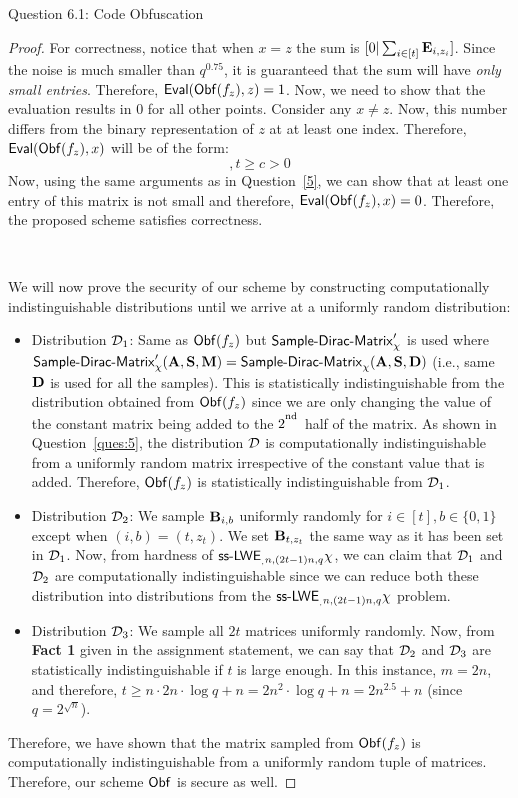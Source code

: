 \begin{solution}{Question 6.1: Code Obfuscation}
\begin{proof}
        For correctness, notice that when $x = z$ the sum is $[0 | \sum_{i\in[t]}\mathbf{E}_{i,z_i}]$. Since the noise is much smaller than $q^{0.75}$, it is guaranteed that the sum will have \textit{only small entries}. Therefore, $\mathsf{Eval}(\mathsf{Obf}(f_z), z) = 1$. Now, we need to show that the evaluation results in $0$ for all other points. Consider any $x\neq z$. Now, this number differs from the binary representation of $z$ at at least one index. Therefore, $\mathsf{Eval}(\mathsf{Obf}(f_z), x)$ will be of the form:
        \begin{equation}
            [\bfA' | \bfS\cdot\bfA' + \sum_{i\in[t]}\bfE_{i,x_i} + c\cdot\bfD], t\geq c > 0
        \end{equation}
        Now, using the same arguments as in Question~\ref{5}, we can show that at least one entry of this matrix is not small and therefore, $\mathsf{Eval}(\mathsf{Obf}(f_z), x) = 0$. Therefore, the proposed scheme satisfies correctness.\par~\par
        We will now prove the security of our scheme by constructing computationally indistinguishable distributions until we arrive at a uniformly random distribution:
        \begin{itemize}
            \item Distribution $\mathcal{D}_1$: Same as $\mathsf{Obf}(f_z)$ but $\mathsf{Sample\text{-}Dirac\text{-}Matrix}_\chi'$ is used where $\mathsf{Sample\text{-}Dirac\text{-}Matrix}_\chi'(\mathbf{A}, \mathbf{S}, \mathbf{M}) = \mathsf{Sample\text{-}Dirac\text{-}Matrix}_\chi(\mathbf{A}, \mathbf{S}, \mathbf{D})$ (i.e., same $\mathbf{D}$ is used for all the samples). This is statistically indistinguishable from the distribution obtained from $\mathsf{Obf}(f_z)$ since we are only changing the value of the constant matrix being added to the $2^\textsuperscript{nd}$ half of the matrix. As shown in Question~\ref{ques:5}, the distribution $\mathcal{D}$ is computationally indistinguishable from a uniformly random matrix irrespective of the constant value that is added. Therefore, $\mathsf{Obf}(f_z)$ is statistically indistinguishable from $\mathcal{D}_1$.
            \item Distribution $\mathcal{D}_2$: We sample $\mathbf{B}_{i,b}$ uniformly randomly for $i\in[t],b\in\{0,1\}$ except when $(i,b) = (t,z_t)$. We set $\mathbf{B}_{t,z_t}$ the same way as it has been set in $\mathcal{D}_1$. Now, from hardness of $\mathsf{ss\text{-}LWE}_{_,n,(2t-1)n,q}{\chi}$, we can claim that $\mathcal{D}_1$ and $\mathcal{D}_2$ are computationally indistinguishable since we can reduce both these distribution into distributions from the $\mathsf{ss\text{-}LWE}_{_,n,(2t-1)n,q}{\chi}$ problem.
            \item Distribution $\mathcal{D}_3$: We sample all $2t$ matrices uniformly randomly. Now, from \textbf{Fact 1} given in the assignment statement, we can say that $\mathcal{D}_2$ and $\mathcal{D}_3$ are statistically indistinguishable if $t$ is large enough. In this instance, $m = 2n$, and therefore, $t\geq n\cdot 2n\cdot\log q + n = 2n^2\cdot\log q + n = 2n^{2.5} + n$ (since $q = 2^{\sqrt{n}}$).
        \end{itemize}
        Therefore, we have shown that the matrix sampled from $\mathsf{Obf}(f_z)$ is computationally indistinguishable from a uniformly random tuple of matrices. Therefore, our scheme $\mathsf{Obf}$ is secure as well.
    \end{proof}
\end{solution}
